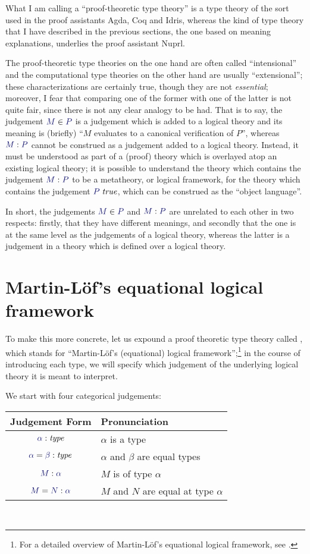 What I am calling a ``proof-theoretic type theory'' is a type theory of the
sort used in the proof assistants Agda, Coq and Idris, whereas the kind of
type theory that I have described in the previous sections, the one based on
meaning explanations, underlies the proof assistant Nuprl.

The proof-theoretic type theories on the one hand are often called
``intensional'' and the computational type theories on the other hand are
usually ``extensional''; these characterizations are certainly true, though
they are not \emph{essential}; moreover, I fear that comparing one of the
former with one of the latter is not quite fair, since there is not any clear
analogy to be had. That is to say, the judgement $\ver{M}{P}$ is a judgement
which is added to a logical theory and its meaning is (briefly) ``$M$ evaluates
to a canonical verification of $P$'', whereas $\ofty{M}{P}$ cannot be construed
as a judgement added to a logical theory. Instead, it must be understood as
part of a (proof) theory which is overlayed atop an existing logical theory; it
is possible to understand the theory which contains the judgement $\ofty{M}{P}$
to be a metatheory, or logical framework, for the theory which contains the
judgement $\istrue{P}$, which can be construed as the ``object language''.

In short, the judgements $\ver{M}{P}$ and $\ofty{M}{P}$ are unrelated to each other in
two respects: firstly, that they have different meanings, and secondly that the
one is at the same level as the judgements of a logical theory, whereas the
latter is a judgement in a theory which is defined over a logical theory.

\section{Martin-L\"of's equational logical framework}

To make this more concrete, let us expound a proof theoretic type
theory called \MLLF, which stands for ``Martin-L\"of's (equational) logical
framework'';\footnote{For a detailed overview of Martin-L\"of's equational logical framework, see \cite{PiMLTT}.} in the course of introducing each type, we will specify
which judgement of the underlying logical theory it is meant to
interpret.

We start with four categorical judgements:\\

\begin{tabular}{c|l}
Judgement Form & Pronunciation \\ \hline
  $\type{\alpha}$ & $\alpha$ is a type \\
  $\etype{\alpha}{\beta}$ & $\alpha$ and $\beta$ are equal types \\
  $\ofty{M}{\alpha}$ & $M$ is of type $\alpha$ \\
  $\eofty{M}{N}{\alpha}$ & $M$ and $N$ are equal at type $\alpha$ \\
\end{tabular}\\

